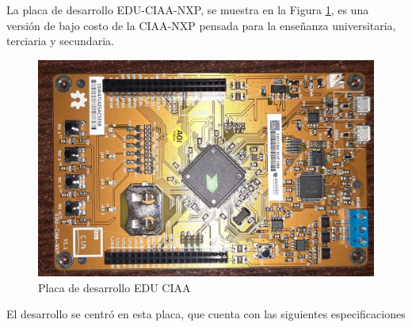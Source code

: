 La placa de desarrollo EDU-CIAA-NXP, se muestra en la Figura \ref{fig:EduCiaaPlaca}, es una versión de bajo costo de la CIAA-NXP \cite{proyectoCIAA} pensada para la enseñanza universitaria, terciaria y secundaria. 
\begin{figure}[H]
    \centering
    \includegraphics[width=0.8\linewidth]{Figuras/datalogger/Hardware/EduCiaaPlaca.jpg}
    \caption{Placa de desarrollo EDU CIAA}
    \label{fig:EduCiaaPlaca}
\end{figure}
El desarrollo se centró en esta placa, que cuenta con las siguientes especificaciones 


